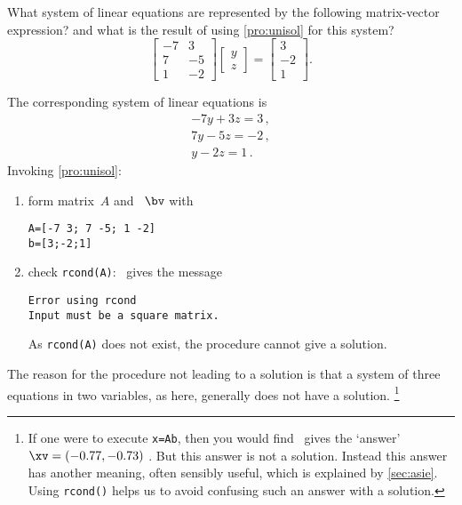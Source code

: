 \begin{example} \label{eg:}
What system of linear equations are represented by the following matrix-vector expression?  and what is the result of using \autoref{pro:unisol} for this system?
\begin{equation*}
\begin{bmatrix} -7&3\\ 7&-5\\1&-2 \end{bmatrix}
\begin{bmatrix} y\\z \end{bmatrix}
=\begin{bmatrix} 3\\-2\\1 \end{bmatrix}.
\end{equation*}

\begin{solution} 
The corresponding system of linear equations is
\begin{equation*}
\begin{array}{l}
-7y+3z=3\,,\\7y-5z=-2\,,\\y-2z=1\,.
\end{array}
\end{equation*}
Invoking \autoref{pro:unisol}:
\begin{enumerate}
\item form matrix~\(A\) and ~\(\bv\) with
\begin{verbatim}
A=[-7 3; 7 -5; 1 -2]
b=[3;-2;1]
\end{verbatim}
\setbox\ajrqrbox\hbox{}%
\marginpar{\usebox{\ajrqrbox\\[2ex]}}%

\item check \verb|rcond(A)|: \script\ gives the message%
\begin{verbatim}
Error using rcond
Input must be a square matrix. 
\end{verbatim}
As \verb|rcond(A)| does not exist, the procedure cannot give a solution.
\end{enumerate}
The reason for the procedure not leading to a solution is that a system of three equations in two variables, as here, generally does not have a solution.
\footnote{If one were to execute \texttt{x=A\slosh b}, then you would find \script\ gives the `answer' \(\xv=(-0.77,-0.73)\) \twodp.
But this answer is not a solution.
Instead this answer has another meaning, often sensibly useful, which is explained by \autoref{sec:asie}.
Using \texttt{rcond()} helps us to avoid confusing such an answer with a solution.}
\end{solution}
\end{example}




